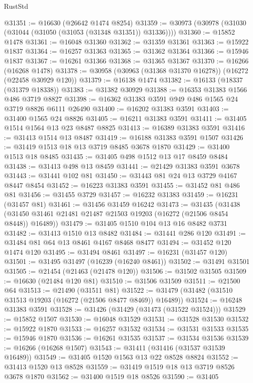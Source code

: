 \begin{lexlean}{RustStd}
\begin{coremodule}
@31351 := @16630 (@26642 @1474 @8254)
@31359 := @30973 (@30978 (@31030 (@31044 (@31050 (@31053 (@31348 @31351)) @31336))))
@31360 := @15852 @1478
@31361 := @16048 @31360
@31362 := @31359 @31361
@31363 := @15922 @1837
@31364 := @16257 @31363
@31365 := @31362 @31364
@31366 := @15946 @1837
@31367 := @16261 @31366
@31368 := @31365 @31367
@31370 := @16266 (@16268 @1478)
@31378 := @30958 (@30963 (@31368 @31370 @16278)) (@16272 (@22458 @30929 @120))
@31379 := @16138 @1474
@31382 := @16133 (@18337 (@31379 @18338))
@31383 := @31382 @30929
@31388 := @16353 @31383 @1566 @486 @3719 @8827
@31398 := @16362 @31383 @3591 @949 @486 @1565 @24 @3719 @8826 @6111 @26490
@31400 := @16202 @31383 @3591
@31403 := @31400 @1565 @24 @8826
@31405 := @16211 @31383 @3591
@31411 := @31405 @1514 @1564 @13 @23 @8487 @8825
@31413 := @16389 @31383 @3591
@31416 := @31413 @1514 @13 @8487
@31419 := @16188 @31383 @3591 @1507
@31426 := @31419 @1513 @18 @13 @3719 @8485 @3678 @1870
@31429 := @31400 @1513 @18 @8485
@31435 := @31405 @498 @1512 @13 @17 @8459 @8484
@31438 := @31413 @498 @13 @8459
@31441 := @21429 @31383 @3591 @3678
@31443 := @31441 @102 @81
@31450 := @31443 @81 @24 @13 @3729 @4167 @8447 @8454
@31452 := @16223 @31383 @3591
@31455 := @31452 @81 @486 @81
@31456 := @31455 @3729
@31457 := @16232 @31383
@31459 := @16231 (@31457 @81)
@31461 := @31456 @31459 @16242
@31473 := @31435
    (@31438 (@31450 @31461 @21481 @21487 @21503 @19203 (@16272 (@21506 @8454 @8448)) @16489))
@31479 := @31405 @1510 @104 @13 @16 @8482 @3731
@31482 := @31413 @1510 @13 @8482
@31484 := @31441 @286 @120
@31491 := @31484 @81 @64 @13 @8461 @4167 @8468 @8477
@31494 := @31452 @120 @1474 @120
@31495 := @31494 @8461
@31497 := @16231 (@31457 @120)
@31501 := @31495 @31497 (@16239 (@16240 @8461))
@31502 := @31491 @31501
@31505 := @21454 (@21463 (@21478 @120))
@31506 := @31502 @31505
@31509 := @16630 (@21484 @120 @81)
@31510 := @31506 @31509
@31511 := @21500 @64
@31513 := @21490 (@31511 @81)
@31522 := @31479 (@31482 (@31510 @31513 @19203 (@16272 (@21506 @8477 @8469)) @16489))
@31524 := @16248 @31383 @3591
@31528 := @31426 (@31429 (@31473 (@31522 @31524)))
@31529 := @15852 @1507
@31530 := @16048 @31529
@31531 := @31528 @31530
@31532 := @15922 @1870
@31533 := @16257 @31532
@31534 := @31531 @31533
@31535 := @15946 @1870
@31536 := @16261 @31535
@31537 := @31534 @31536
@31539 := @16266 (@16268 @1507)
@31543 := @31411 (@31416 (@31537 @31539 @16489))
@31549 := @31405 @1520 @1563 @13 @22 @8528 @8824
@31552 := @31413 @1520 @13 @8528
@31559 := @31419 @1519 @18 @13 @3719 @8526 @3678 @1870
@31562 := @31400 @1519 @18 @8526
@31590 := @31405

\end{coremodule}
\end{lexlean}
